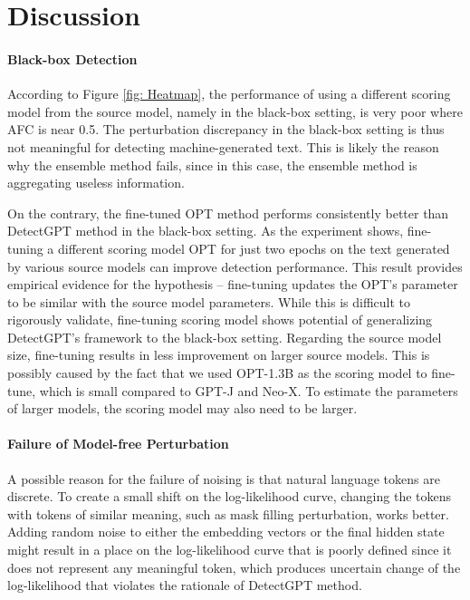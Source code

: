 \documentclass[11pt]{article}
\begin{document}
\section{Discussion}\label{6}

\paragraph{Black-box Detection}
According to Figure \ref{fig: Heatmap}, the performance of using a different scoring model from the source model, namely in the black-box setting, is very poor where AFC is near 0.5. The perturbation discrepancy in the black-box setting is thus not meaningful for detecting machine-generated text. This is likely the reason why the ensemble method fails, since in this case, the ensemble method is aggregating useless information.

On the contrary, the fine-tuned OPT method performs consistently better than DetectGPT method in the black-box setting. As the experiment shows, fine-tuning a different scoring model OPT for just two epochs on the text generated by various source models can improve detection performance. This result provides empirical evidence for the hypothesis – fine-tuning updates the OPT's parameter to be similar with the source model parameters. While this is difficult to rigorously validate, fine-tuning scoring model shows potential of generalizing DetectGPT's framework to the black-box setting. Regarding the source model size, fine-tuning results in less improvement on larger source models. This is possibly caused by the fact that we used OPT-1.3B as the scoring model to fine-tune, which is small compared to GPT-J and Neo-X. To estimate the parameters of larger models, the scoring model may also need to be larger.

\paragraph{Failure of Model-free Perturbation} A possible reason for the failure of noising is that natural language tokens are discrete. To create a small shift on the log-likelihood curve, changing the tokens with tokens of similar meaning, such as mask filling perturbation, works better. Adding random noise to either the embedding vectors or the final hidden state might result in a place on the log-likelihood curve that is poorly defined since it does not represent any meaningful token, which produces uncertain change of the log-likelihood that violates the rationale of DetectGPT method.
\end{document}
